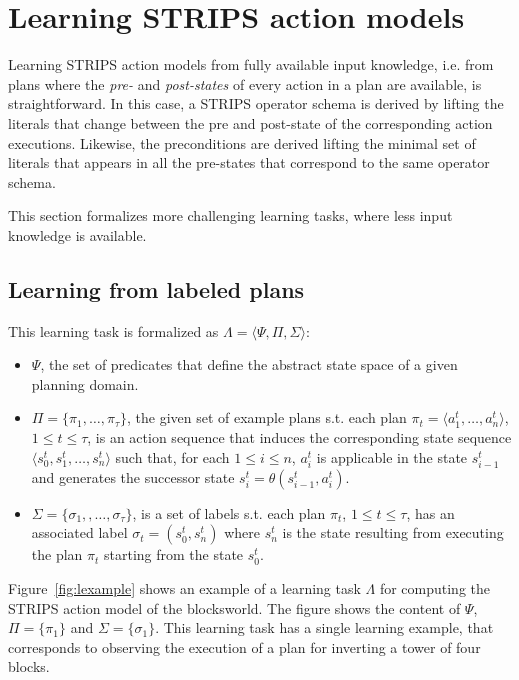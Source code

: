 \documentclass[letterpaper]{article} %
\newcommand{\tup}[1]{{\langle #1 \rangle}}
\begin{document}
\section{Learning STRIPS action models}
Learning STRIPS action models from fully available input knowledge, i.e. from plans where the {\em pre-} and {\em post-states} of every action in a plan are available, is straightforward. In this case, a STRIPS operator schema is derived by lifting the literals that change between the pre and post-state of the corresponding action executions. Likewise, the preconditions are derived lifting the minimal set of literals that appears in all the pre-states that correspond to the same operator schema.

This section formalizes more challenging learning tasks, where less input knowledge is available.

\subsection{Learning from labeled plans}
This learning task is formalized as $\Lambda=\tup{\Psi,\Pi,\Sigma}$: 
\begin{itemize}
\item $\Psi$, the set of predicates that define the abstract state space of a given planning domain. 
\item $\Pi=\{\pi_1,\ldots,\pi_{\tau}\}$, the given set of example plans s.t. each plan $\pi_t=\tup{a_1^t, \ldots, a_n^t}$, {\small $1\leq t\leq \tau$}, is an action sequence that induces the corresponding state sequence $\tup{s_0^t, s_1^t, \ldots, s_n^t}$ such that, for each {\small $1\leq i\leq n$}, $a_i^t$ is applicable in the state $s_{i-1}^t$ and generates the successor state $s_i^t=\theta(s_{i-1}^t,a_i^t)$.
\item $\Sigma=\{\sigma_1,,\ldots,\sigma_{\tau}\}$, is a set of labels s.t. each plan $\pi_t$, {\small $1\leq t\leq \tau$}, has an associated label $\sigma_t=(s_0^t,s_{n}^t)$ where $s_{n}^t$ is the state resulting from executing the plan $\pi_t$ starting from the state $s_0^t$. 
\end{itemize}

Figure~\ref{fig:lexample} shows an example of a learning task $\Lambda$ for computing the STRIPS action model of the blocksworld. The figure shows the content of $\Psi$, $\Pi=\{\pi_1\}$ and $\Sigma=\{\sigma_1\}$. This learning task has a single learning example, that corresponds to observing the execution of a plan for inverting a tower of four blocks.
\end{document}
